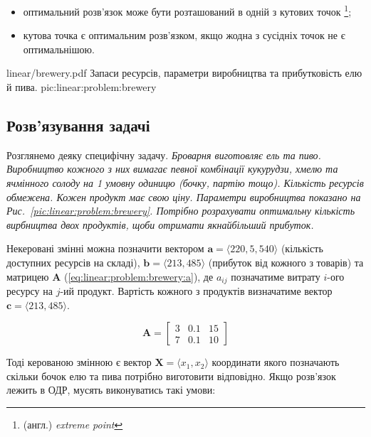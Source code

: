\documentclass[\main/book.tex]{subfiles}
\begin{document}
\begin{conclusions}
\begin{itemize}
 \item оптимальний розв'язок може бути розташований в одній з кутових точок \footnote{(англ.) \textit{extreme point}};
 \item кутова точка є оптимальним розв'язком, якщо жодна з сусідніх точок не є оптимальнішою.
\end{itemize}
\label{conclusion:linear:optimal_solution}
\end{conclusions}

\illustration
 {linear/brewery.pdf}
 {Запаси ресурсів, параметри ви\-роб\-ниц\-тва та прибутковість елю й пива.}
 {pic:linear:problem:brewery}

\subsection{Розв'язування задачі}

Розглянемо деяку специфічну задачу. \textit{Броварня виготовляє ель та пиво. Виробництво кожного з них вимагає певної комбінації кукурудзи, хмелю та ячмінного солоду на 1 умовну одиницю (бочку, партію тощо). Кількість ресурсів обмежена. Кожен продукт має свою ціну. Параметри виробництва показано на Рис.~\ref{pic:linear:problem:brewery}. Потрібно розрахувати оптимальну кількість вирбництва двох продуктів, щоби отримати якнайбільший прибуток.}

Некеровані змінні можна позначити вектором $\mathbf{a} = {\langle 220, 5, 540 \rangle}$ (кількість доступних ресурсів на складі), $\mathbf{b} = {\langle 213, 485 \rangle}$ (прибуток від кожного з товарів) та матрицею $\mathbf{A}$ (\ref{eq:linear:problem:brewery:a}), де $a_{ij}$ позначатиме витрату $i$-ого ресурсу на $j$-ий продукт. Вартість кожного з продуктів визначатиме вектор $\mathbf{c} = {\langle 213, 485 \rangle}$.

\begin{equation}
 \mathbf{A} = \begin{bmatrix}
               3 & 0.1 & 15 \\
               7 & 0.1 & 10
              \end{bmatrix}
 \label{eq:linear:problem:brewery:a}
\end{equation}

Тоді керованою змінною є вектор $\mathbf{X} = \langle x_1, x_2 \rangle$ координати якого позначають скільки бочок елю та пива потрібно виготовити відповідно. Якщо розв'язок лежить в ОДР, мусять виконуватись такі умови:
\end{document}
